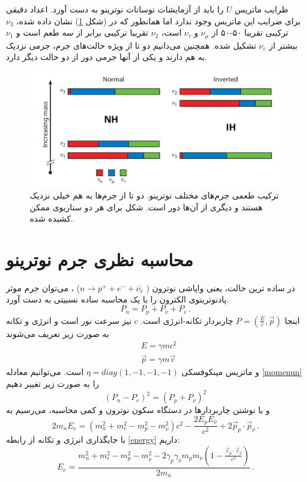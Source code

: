 \documentclass[a4paper,11pt,oneside,openany]{iut-thesis}
\begin{document}
ظرایب ماتریس $U$ را باید از آزمایشات نوسانات نوترینو به دست آورد. اعداد دقیقی برای ضرایب این ماتریس وجود ندارد اما همانطور که در (شکل 
\ref{flavour})
 نشان داده شده، $\nu_{3}$ ترکیبی تقریبا ۵۰-۵۰ از $\nu_{\mu}$ و $\nu_{\tau}$ است، $\nu_{2}$ تقریبا ترکیبی برابر از سه طعم است و $\nu_{1}$ بیشتر از $\nu_{e}$ تشکیل شده. همچنین می‌دانیم دو تا از ویژه حالت‌های جرم، جرمی نزدیک به هم دارند و یکی از آنها جرمی دور از دو حالت دیگر دارد.
\begin{figure}
	\includegraphics[angle=0,width=\textwidth,clip=0]{neutrino-mass-flavour}
	\caption{
		ترکیب طعمی جرم‌های مختلف نوترینو. دو تا از جرم‌ها به هم خیلی نزدیک هستند و دیگری از آن‌ها دور است. شکل برای هر دو سناریوی ممکن کشیده شده.
	}
	\label{flavour}
\end{figure}


\section{
محاسبه نظری جرم نوترینو
}\label{mass}
در ساده ترین حالت، یعنی واپاشی نوترون (
$n \rightarrow p^{+} + e^{-} + \bar{\nu_{e}}$)
، می‌توان جرم موثر پادنوترینوی الکترون را با یک محاسبه ساده نسبیتی به دست آورد.
\begin{equation}\label{momenun}
P_{n} = P_{p} + P_{\bar{\nu}} + P_{e}\,.
\end{equation}
اینجا 
$P = (\frac{E}{c}, \vec{p})$ 
چاربردار تکانه-انرژی است. $c$ نیز سرعت نور است و انرژی و تکانه به صورت زیر تعریف می‌شوند
\begin{align}\label{energy}
&E = \gamma m c^{2}\\
&\vec{p} = \gamma m \vec{v}
\end{align}
و ماتریس مینکوفسکی $\eta = diag(1, -1, -1, -1)$ است.
می‌توانیم معادله 
\ref{momenun}
 را به صورت زیر تغییر دهیم
\begin{equation}
(P_{n} - P_{e})^{2} = (P_{p} + P_{\bar{\nu}})^{2}
\end{equation}
و با نوشتن چاربردارها در دستگاه سکون نوترون و کمی محاسبه، می‌رسیم به
\begin{equation}
2 m_{n} E_{e} = (m_{n}^{2} + m_{e}^{2} - m_{p}^2 - m_{\bar{\nu}}^{2}) c^{2} - \frac{2 E_{p} E_{\bar{\nu}}}{c^{2}} + 2 \vec{p}_{p} \cdot \vec{p}_{\bar{\nu}}\, .
\end{equation}
با جایگذاری انرژی و تکانه از رابطه 
\ref{energy} 
داریم:
\begin{equation}\label{minimize}
E_{e} = \frac{m_{n}^{2} + m_{e}^{2} - m_{p}^{2} - m_{\bar{\nu}}^{2} - 2 \gamma_{p} \gamma_{\bar{\nu}} m_{p} m_{\bar{\nu}} (1 - \frac{\vec{v}_{p} \cdot \vec{v}_{\bar{\nu}}}{c^{2}})}{2 m_{n}}\,.
\end{equation}
\end{document}
